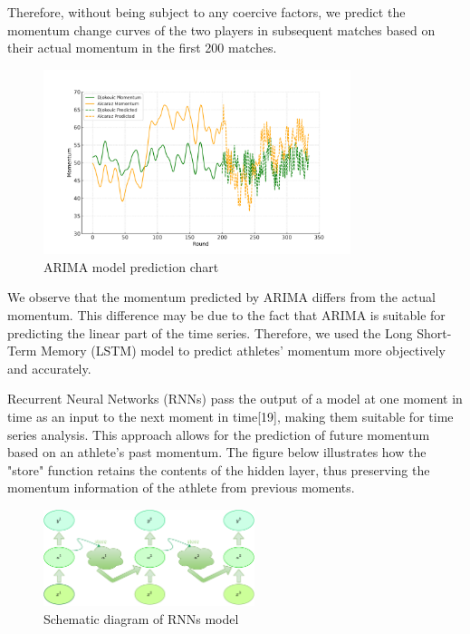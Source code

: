\documentclass[12pt]{article}  %
\begin{document}
Therefore, without being subject to any coercive factors, we predict the momentum change curves of the two players in subsequent matches based on their actual momentum in the first 200 matches.

\begin{figure}[htbp]
    \centering
    \includegraphics[width=0.8\textwidth]{picture/arima_simulation_momentum_adjusted.pdf} 	%
    \caption{ARIMA model prediction chart}		%
    \label{fig:sensitive_analysis1}							%
\end{figure}
\FloatBarrier

We observe that the momentum predicted by ARIMA differs from the actual momentum. This difference may be due to the fact that ARIMA is suitable for predicting the linear part of the time series. Therefore, we used the Long Short-Term Memory (LSTM) model to predict athletes' momentum more objectively and accurately.


Recurrent Neural Networks (RNNs) pass the output of a model at one moment in time as an input to the next moment in time[19], making them suitable for time series analysis. This approach allows for the prediction of future momentum based on an athlete's past momentum. The figure below illustrates how the "store" function retains the contents of the hidden layer, thus preserving the momentum information of the athlete from previous moments.

\begin{figure}[htbp]
    \centering
    \includegraphics[width=0.55\textwidth]{picture/store.pdf} 	%
    \caption{Schematic diagram of RNNs model}		%
    \label{fig:sensitive_analysis1}							%
\end{figure}
\FloatBarrier
\end{document}
